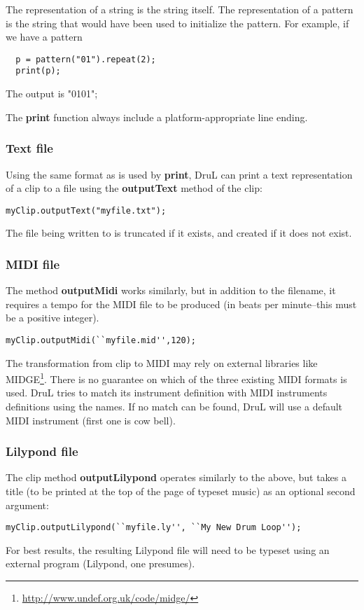 The representation of a string is the string itself. The representation
of a pattern is the string that would have been used to initialize
the pattern. For example, if we have a pattern
\begin{verbatim}
  p = pattern("01").repeat(2);
  print(p);
\end{verbatim}
The output is "0101";

The \textbf{print} function always include a platform-appropriate line
ending.

\subsubsection{Text file}

Using the same format as is used by \textbf{print}, DruL can print a text representation of a clip to a file
using the \textbf{outputText} method of the clip:

\begin{verbatim}
myClip.outputText("myfile.txt");
\end{verbatim}

The file being written to is truncated if it exists, and created if it does not exist.

\subsubsection{MIDI file}

The method \textbf{outputMidi} works similarly, but in addition to the filename, it requires a tempo for the MIDI file to be produced (in beats per minute--this must be a positive integer).

\begin{verbatim}
myClip.outputMidi(``myfile.mid'',120);
\end{verbatim}

The transformation from clip to MIDI may rely
on external libraries like MIDGE\footnote{\url{http://www.undef.org.uk/code/midge/}}. There is no guarantee on which of the three existing MIDI formats is used.
DruL tries to match its instrument definition with MIDI instruments definitions
using the names. If no match can be found, DruL will use a default MIDI instrument (first one is cow bell).

\subsubsection{Lilypond file}

The clip method \textbf{outputLilypond} operates similarly to the above, but takes a title (to be printed at the top of the page of typeset music) as an optional second argument:

\begin{verbatim}
myClip.outputLilypond(``myfile.ly'', ``My New Drum Loop'');
\end{verbatim}


For best results, the resulting Lilypond file will need to be typeset using an external program (Lilypond, one presumes).

\clearpage
